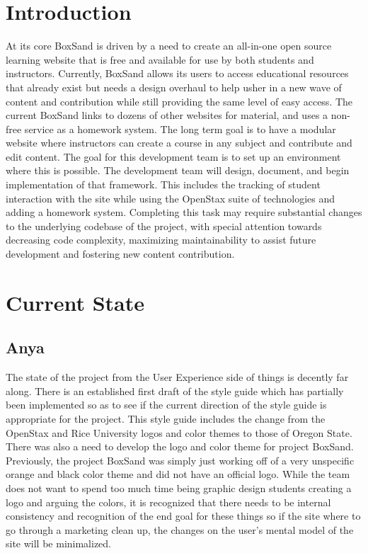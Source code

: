 \documentclass[onecolumn, draftclsnofoot,10pt, compsoc]{IEEEtran}
\begin{document}
\tableofcontents

\clearpage
\singlespacing

\section{Introduction}
At its core BoxSand is driven by a need to create an all-in-one open source learning website that is free and available for use by both students and instructors. Currently, BoxSand allows its users to access educational resources that already exist but needs a design overhaul to help usher in a new wave of content and contribution while still providing the same level of easy access. The current BoxSand links to dozens of other websites for material, and uses a non-free service as a homework system. The long term goal is to have a modular website where instructors can create a course in any subject and contribute and edit content. The goal for this development team is to set up an environment where this is possible. The development team will design, document, and begin implementation of that framework. This includes the tracking of student interaction with the site while using the OpenStax suite of technologies and adding a homework system. Completing this task may require substantial changes to the underlying codebase of the project, with special attention towards decreasing code complexity, maximizing maintainability to assist future development and fostering new content contribution.
\section{Current State}
\subsection{Anya}
The state of the project from the User Experience side of things is decently far along. There is an established first draft of the style guide which has partially been implemented so as to see if the current direction of the style guide is appropriate for the project. This style guide includes the change from the OpenStax and Rice University logos and color themes to those of Oregon State. There was also a need to develop the logo and color theme for project BoxSand. Previously, the project BoxSand was simply just working off of a very unspecific orange and black color theme and did not have an official logo. While the team does not want to spend too much time being graphic design students creating a logo and arguing the colors, it is recognized that there needs to be internal consistency and recognition of the end goal for these things so if the site where to go through a marketing clean up, the changes on the user’s mental model of the site will be minimalized. 
\end{document}
